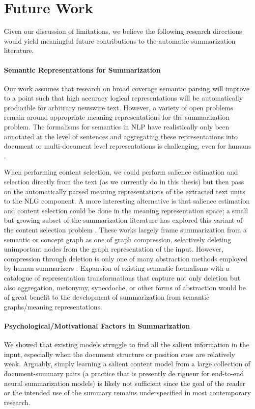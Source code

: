 \section{Future Work}


Given our discussion of limitations, we believe the following research directions would yield meaningful future contributions to the automatic summarization
literature.

\paragraph{Semantic Representations for Summarization}

Our work assumes that research on broad coverage semantic parsing will improve
to a point such that high accuracy logical representations
will be automatically producible for arbitrary newswire text.
However, a variety of open problems remain around appropriate meaning 
representations for the summarization problem.
The formalisms for semantics in NLP have realistically only been annotated
at the level of sentences and aggregating these representations into document
or multi-document level representations is challenging, even for humans
\citep{ogorman2018}. 

When performing content selection, we could perform salience estimation and
selection directly from the text (as we currently do in this thesis) but then
pass on the automatically parsed meaning representations of the extracted text
units to the NLG component.  A more interesting alternative is that salience
estimation and content selection could be done in the meaning representation
space; a small but growing subset of the summarization literature has explored
this variant of the content selection problem \citep{falke2017,liao2018,falke2019}.  These works largely
frame summarization from a semantic or concept graph as one of graph
compression, selectively deleting unimportant nodes from the graph
representation of the input. However, compression through deletion is only one
of many abstraction methods employed by human summarizers \citep{jing2000b}.
Expansion of existing semantic formalisms with a  catalogue of representation
transformations that capture not only deletion but also aggregation, metonymy,
synecdoche, or other forms of abstraction would be of great benefit to the
development of summarization from semantic graphs/meaning representations.



\paragraph{Psychological/Motivational Factors in Summarization} We showed
that existing models struggle to find all the salient information in the input,
 especially when the document structure or position cues are relatively weak. Arguably,
simply learning a salient content model from a large collection of
document-summary pairs (a practice that is presently de rigueur for end-to-end neural summarization models) is likely not sufficient since the goal of the reader or the intended use of the summary remains underspecified in most contemporary research. 


